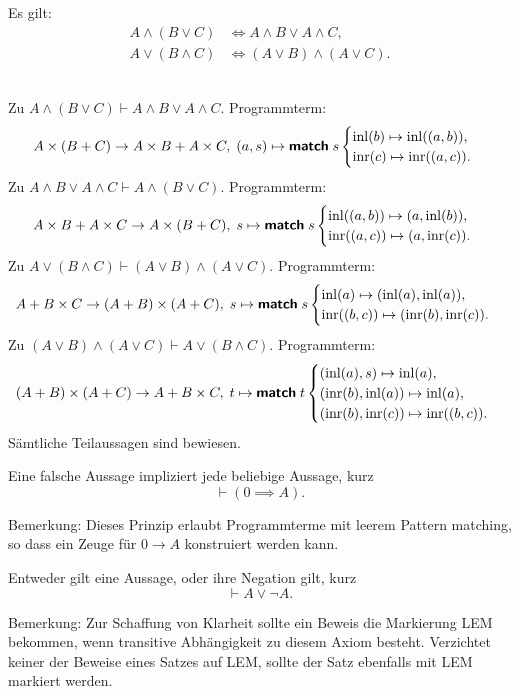 \begin{Satz}%
\label{bool-dl}
Es gilt:
\begin{align}
A\land (B\lor C) &\iff A\land B\lor A\land C,\\
A\lor (B\land C) &\iff (A\lor B)\land (A\lor C).
\end{align}
\end{Satz}
\\
Zu $A\land (B\lor C) \vdash A\land B\lor A\land C$.
Programmterm:
\[A\times (B+C) \to A\times B + A\times C,\; (a, s)\mapsto \text{{\normalfont\sffamily\bfseries match}}\; s \begin{cases}
\operatorname{inl}(b)\mapsto \operatorname{inl}((a,b)),\\
\operatorname{inr}(c)\mapsto \operatorname{inr}((a,c)).
\end{cases}\]
Zu $A\land B\lor A\land C\vdash A\land (B\lor C)$.
Programmterm:
\[A\times B + A\times C\to A\times (B + C),\;
s\mapsto\text{{\normalfont\sffamily\bfseries match}}\; s\begin{cases}
\operatorname{inl}((a,b))\mapsto (a, \operatorname{inl}(b)),\\
\operatorname{inr}((a,c))\mapsto (a, \operatorname{inr}(c)).
\end{cases}
\]
Zu $A\lor (B\land C) \vdash (A\lor B)\land (A\lor C)$. Programmterm:
\[A+B\times C\to (A+B)\times (A+C),\;
s\mapsto\text{{\normalfont\sffamily\bfseries match}}\; s\begin{cases}
\operatorname{inl}(a)\mapsto (\operatorname{inl}(a),\operatorname{inl}(a)),\\
\operatorname{inr}((b,c))\mapsto (\operatorname{inr}(b),\operatorname{inr}(c)).
\end{cases} 
\]
Zu $(A\lor B)\land (A\lor C)\vdash A\lor (B\land C)$. Programmterm:
\[
(A+B)\times (A+C)\to A + B\times C,\;
t\mapsto\text{{\normalfont\sffamily\bfseries match}}\; t\begin{cases}
(\operatorname{inl}(a), s) \mapsto\operatorname{inl}(a),\\
(\operatorname{inr}(b), \operatorname{inl}(a)) \mapsto\operatorname{inl}(a),\\
(\operatorname{inr}(b), \operatorname{inr}(c)) \mapsto\operatorname{inr}((b, c)).
\end{cases}
\]
Sämtliche Teilaussagen sind bewiesen.\;\qedsymbol

\begin{Axiom}\label{PE}
Eine falsche Aussage impliziert jede beliebige Aussage, kurz
\[\vdash (0\implies A).\]
\end{Axiom}
Bemerkung: Dieses Prinzip erlaubt Programmterme mit leerem
Pattern matching, so dass ein Zeuge für $0\to A$ konstruiert
werden kann.

\begin{Axiom}\label{LEM}\newlinefirst
Entweder gilt eine Aussage, oder ihre Negation gilt, kurz
\[\vdash A\lor\neg A.\]
\end{Axiom}
Bemerkung: Zur Schaffung von Klarheit sollte ein Beweis die Markierung
LEM bekommen, wenn transitive Abhängigkeit zu diesem Axiom besteht.
Verzichtet keiner der Beweise eines Satzes auf LEM, sollte der Satz
ebenfalls mit LEM markiert werden.

